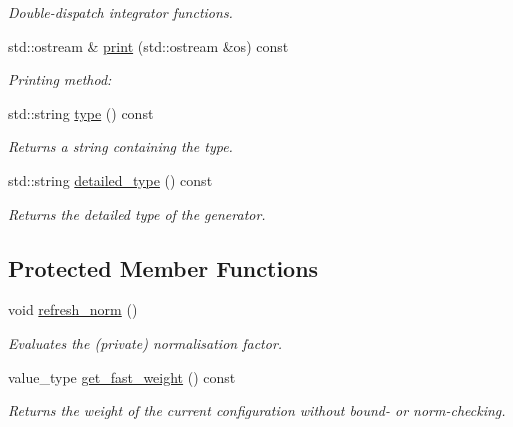 \begin{DoxyCompactItemize}
\begin{DoxyCompactList}\small\item\em Double-\/dispatch integrator functions. \end{DoxyCompactList}\item 
\hypertarget{a00125_a4d94771d6303b5c89b22263233575db2}{std\-::ostream \& \hyperlink{a00125_a4d94771d6303b5c89b22263233575db2}{print} (std\-::ostream \&os) const }\label{a00125_a4d94771d6303b5c89b22263233575db2}

\begin{DoxyCompactList}\small\item\em Printing method\-: \end{DoxyCompactList}\item 
\hypertarget{a00125_abd06eef90d724092e8ac6df64f54f591}{std\-::string \hyperlink{a00125_abd06eef90d724092e8ac6df64f54f591}{type} () const }\label{a00125_abd06eef90d724092e8ac6df64f54f591}

\begin{DoxyCompactList}\small\item\em Returns a string containing the type. \end{DoxyCompactList}\item 
\hypertarget{a00125_ada05cf97d5f4f13ee537bdac12bdefef}{std\-::string \hyperlink{a00125_ada05cf97d5f4f13ee537bdac12bdefef}{detailed\-\_\-type} () const }\label{a00125_ada05cf97d5f4f13ee537bdac12bdefef}

\begin{DoxyCompactList}\small\item\em Returns the detailed type of the generator. \end{DoxyCompactList}\end{DoxyCompactItemize}
\subsection*{Protected Member Functions}
\begin{DoxyCompactItemize}
\item 
\hypertarget{a00125_a6880fdd00c91fefc926afee6579d6b10}{void \hyperlink{a00125_a6880fdd00c91fefc926afee6579d6b10}{refresh\-\_\-norm} ()}\label{a00125_a6880fdd00c91fefc926afee6579d6b10}

\begin{DoxyCompactList}\small\item\em Evaluates the (private) normalisation factor. \end{DoxyCompactList}\item 
value\-\_\-type \hyperlink{a00125_a1177d7050fcd3fd879ee7ff3427225ee}{get\-\_\-fast\-\_\-weight} () const 
\begin{DoxyCompactList}\small\item\em Returns the weight of the current configuration without bound-\/ or norm-\/checking. \end{DoxyCompactList}\end{DoxyCompactItemize}
